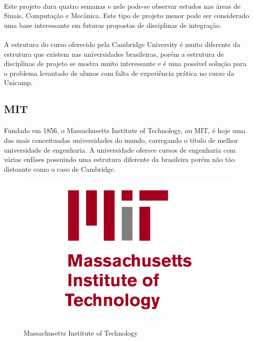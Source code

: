 \documentclass[12pt]{article} %
\begin{document}
\paragraph{} Este projeto dura quatro semanas e nele pode-se observar estudos nas áreas de Sinais, Computação e Mecânica. Este tipo de projeto menor pode ser considerado uma base interessante em futuras propostas de disciplinas de integração.

\paragraph{} A estrutura do curso oferecido pela Cambridge University é muito diferente da estrutura que existem nas universidades brasileiras, porém a estrutura de disciplinas de projeto se mostra muito interessante e é uma possível solução para o problema levantado de alunos
com falta de experiência prática no curso da Unicamp.


\subsection{MIT}

\paragraph{} Fundado em 1856, o Massachusetts Institute of Technology, ou MIT, é hoje uma das mais conceituadas universidades do mundo, carregando o título de melhor universidade de engenharia. A universidade oferece cursos de engenharia com várias enfâses possuindo uma estrutura
diferente da brasileira porém não tão distoante como o caso de Cambridge.

\begin{figure}[H]
\centering
\includegraphics[scale=0.4]{pictures/MIT-Logo.png}\\
\caption{Massachusetts Institute of Technology}
\end{figure}
\end{document}
